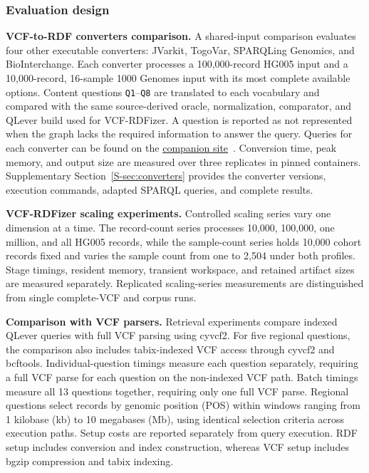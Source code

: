 \documentclass[pdflatex,sn-mathphys-num,referee]{sn-jnl}
\begin{document}
\subsubsection{Evaluation design}\label{subsec:eval-scalability}
\textbf{VCF-to-RDF converters comparison.}
A shared-input comparison evaluates four other executable converters: JVarkit, TogoVar, SPARQLing Genomics, and BioInterchange.
Each converter processes a 100,000-record HG005 input and a 10,000-record, 16-sample 1000 Genomes input with its most complete available options.
Content questions \texttt{Q1}--\texttt{Q8} are translated to each vocabulary and compared with the same source-derived oracle, normalization, comparator, and QLever build used for VCF-RDFizer.
A question is reported as not represented when the graph lacks the required information to answer the query.
Queries for each converter can be found on the \href{https://ecrum19.github.io/vcf-rdfizer-testing/#rq3-queries}{companion site}~\cite{vcfrdfizer_results_site}.
Conversion time, peak memory, and output size are measured over three replicates in pinned containers.
Supplementary Section~\ref{S-sec:converters} provides the converter versions, execution commands, adapted SPARQL queries, and complete results.

\textbf{VCF-RDFizer scaling experiments.}
Controlled scaling series vary one dimension at a time.
The record-count series processes 10,000, 100,000, one million, and all HG005 records, while the sample-count series holds 10,000 cohort records fixed and varies the sample count from one to 2,504 under both profiles.
Stage timings, resident memory, transient workspace, and retained artifact sizes are measured separately.
Replicated scaling-series measurements are distinguished from single complete-VCF and corpus runs.

\textbf{Comparison with VCF parsers.}
Retrieval experiments compare indexed QLever queries with full VCF parsing using cyvcf2.
For five regional questions, the comparison also includes tabix-indexed VCF access through cyvcf2 and bcftools.
Individual-question timings measure each question separately, requiring a full VCF parse for each question on the non-indexed VCF path.
Batch timings measure all 13 questions together, requiring only one full VCF parse.
Regional questions select records by genomic position (POS) within windows ranging from 1 kilobase (kb) to 10 megabases (Mb), using identical selection criteria across execution paths.
Setup costs are reported separately from query execution.
RDF setup includes conversion and index construction, whereas VCF setup includes bgzip compression and tabix indexing.
\end{document}
